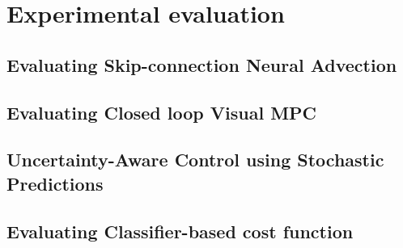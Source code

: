 \section{Experimental evaluation}

\subsection{Evaluating Skip-connection Neural Advection}


\subsection{Evaluating Closed loop Visual MPC}


\subsection{Uncertainty-Aware Control using Stochastic Predictions}


\subsection{Evaluating Classifier-based cost function}



